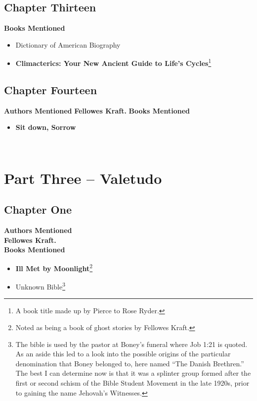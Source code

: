 \documentclass[twoside,10pt]{report}
\newcommand\fleuron{\begin{turn}{45}\Large \ding{166}\end{turn}}
\newcommand\doublefleuron{%
	\reflectbox{\fleuron}\AC\staveXLIX\reflectbox{\AC}\fleuron}
\newcommand\fleuronbar{%
	{\huge\LinearACCCXIII}\xrfill[1.3ex]{1pt}\doublefleuron\xrfill[1.3ex]{1pt}\reflectbox{\huge\LinearACCCXIII}}
\newcommand\nbvspace[1][3]{\vspace*{\stretch{#1}}}
\begin{document}
\section{Chapter Thirteen}
\textbf{Books Mentioned}
\begin{itemize}
\item Dictionary of American Biography \cite{LearnedSocieties1943}
\item \textbf{Climacterics: Your New Ancient Guide to Life’s Cycles}\footnote{A book title made up by Pierce to Rose Ryder.} \cite{Muchon.d}
\end{itemize}

\section{Chapter Fourteen}
\textbf{Authors Mentioned}
\textbf{Fellowes Kraft.}
\textbf{Books Mentioned}
\begin{itemize}
\item \textbf{Sit down, Sorrow} \cite{Craft1960}
\end{itemize}

\begin{center}
\vfill
\shadowoffset{1pt}
\shadowtext{%
{\color{Mahogany}\fontsize{60}{64}\staveLVIII}}\\
\nbvspace[1]
\end{center}

\chapter{Part Three -- Valetudo}
\section{Chapter One}
\textbf{Authors Mentioned}\\
\textbf{Fellowes Kraft.}
\\

\textbf{Books Mentioned}
\begin{itemize}
\item \textbf{Ill Met by Moonlight}\footnote{Noted as being a book of ghost stories by Fellowes Kraft.} \cite{KraftIll}
\item Unknown Bible\footnote{The bible is used by the pastor at Boney’s funeral where Job 1:21 is quoted. As an aside this led to a look into the possible origins of the particular denomination that Boney belonged to, here named ``The Danish Brethren.'' The best I can determine now is that it was a splinter group formed after the first or second schism of the Bible Student Movement in the late 1920s, prior to gaining the name Jehovah’s Witnesses.}
\end{itemize}
\end{document}
